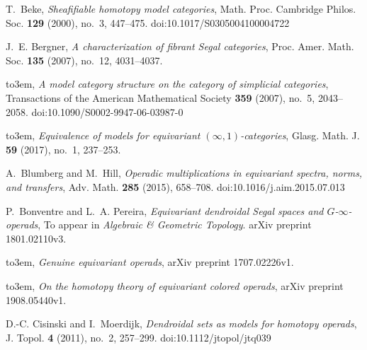 \documentclass[a4paper,10pt]{article}%
\numberwithin{equation}{section}
\numberwithin{figure}{section}
\theoremstyle{definition} %
\newcommand{\1}{\ensuremath{\mathbbm 1}}%
\begin{document}
\providecommand{\bysame}{\leavevmode\hbox to3em{\hrulefill}\thinspace}
\providecommand{\MR}{\relax\ifhmode\unskip\space\fi MR }
\providecommand{\MRhref}[2]{%
	\href{http://www.ams.org/mathscinet-getitem?mr=#1}{#2}
}
\providecommand{\doi}[1]{%
	doi:\href{https://dx.doi.org/#1}{#1}}
\providecommand{\arxiv}[1]{%
	arXiv:\href{https://arxiv.org/abs/#1}{#1}}
\providecommand{\href}[2]{#2}
\begin{thebibliography}{CM13b}
	
	T.~Beke, \emph{Sheafifiable homotopy model categories}, Math. Proc. Cambridge
	Philos. Soc. \textbf{129} (2000), no.~3, 447--475.
	\doi{10.1017/S0305004100004722}
	
	J.~E. Bergner, \emph{A characterization of fibrant {S}egal categories}, Proc.
	Amer. Math. Soc. \textbf{135} (2007), no.~12, 4031--4037.
	
	\bysame, \emph{A model category structure on the category of simplicial
		categories}, Transactions of the American Mathematical Society \textbf{359}
	(2007), no.~5, 2043--2058. \doi{10.1090/S0002-9947-06-03987-0}
	
	\bysame, \emph{Equivalence of models for equivariant
		{$(\infty,1)$}-categories}, Glasg. Math. J. \textbf{59} (2017), no.~1,
	237--253.
	
	A.~Blumberg and M.~Hill, \emph{Operadic multiplications in equivariant spectra,
		norms, and transfers}, Adv. Math. \textbf{285} (2015), 658--708.
	\doi{10.1016/j.aim.2015.07.013}
	
	P.~Bonventre and L.~A. Pereira, \emph{Equivariant dendroidal {S}egal spaces and
		{$G$-$\infty$-}operads}, To appear in \textit{Algebraic \& Geometric
		Topology}. arXiv preprint
	\href{https://arxiv.org/abs/1801.02110v3}{1801.02110v3}.
	
	\bysame, \emph{Genuine equivariant operads}, arXiv preprint
	\href{https://arxiv.org/abs/1707.02226v1}{1707.02226v1}.
	
	\bysame, \emph{On the homotopy theory of equivariant colored operads}, arXiv
	preprint \href{https://arxiv.org/abs/1908.05440v1}{1908.05440v1}.
	
	D.-C. Cisinski and I.~Moerdijk, \emph{Dendroidal sets as models for homotopy
		operads}, J. Topol. \textbf{4} (2011), no.~2, 257--299.
	\doi{10.1112/jtopol/jtq039}
	

\end{thebibliography}
\end{document}
